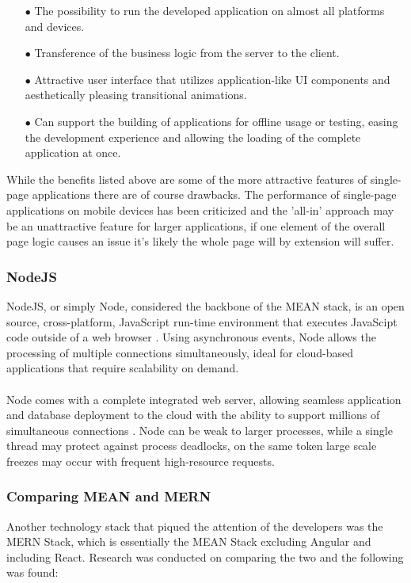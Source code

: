 \begin{enumerate}
    \item[$\bullet$] The possibility to run the developed application on almost all platforms and devices.
    \item[$\bullet$] Transference of the business logic from the server to the client.
    \item[$\bullet$] Attractive user interface that utilizes application-like UI components and aesthetically pleasing transitional animations.
    \item[$\bullet$] Can support the building of applications for offline usage or testing, easing the development experience and allowing the loading of the complete application at once.
\end{enumerate}

While the benefits listed above \cite{SPA} are some of the more attractive features of single-page applications there are of course drawbacks. The performance of single-page applications on mobile devices has been criticized and the 'all-in' approach may be an unattractive feature for larger applications, if one element of the overall page logic causes an issue it's likely the whole page will by extension will suffer.

\subsubsection{NodeJS}
NodeJS, or simply Node, considered the backbone of the MEAN stack, is an open source, cross-platform, JavaScript run-time environment that executes JavaScipt code outside of a web browser \cite{NODE}. Using asynchronous events, Node allows the processing of multiple connections simultaneously, ideal for cloud-based applications that require scalability on demand. 

\paragraph{}
Node comes with a complete integrated web server, allowing seamless application and database deployment to the cloud with the ability to support millions of simultaneous connections \cite{NODE_TWO}. Node can be weak to larger processes, while a single thread may protect against process deadlocks, on the same token large scale freezes may occur with frequent high-resource requests.

\subsubsection{Comparing MEAN and MERN}
Another technology stack that piqued the attention of the developers was the MERN Stack, which is essentially the MEAN Stack excluding Angular and including React. Research was conducted on comparing the two \cite{MEAN_STACK_vs_MERN_STACK} and the following was found:

